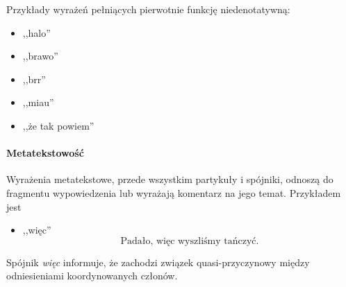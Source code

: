 \documentclass[12pt]{mwart}
\theoremstyle{remark}
\begin{document}
Przykłady wyrażeń pełniących pierwotnie funkcję niedenotatywną:
\begin{itemize}
	\item ,,halo''
	\item ,,brawo''
	\item ,,brr''
	\item ,,miau''
	\item ,,że tak powiem''
\end{itemize}

\paragraph{Metatekstowość}
Wyrażenia metatekstowe, przede wszystkim partykuły i spójniki, odnoszą do fragmentu wypowiedzenia lub wyrażają komentarz na jego temat. Przykładem jest
\begin{itemize}
\item ,,więc''
\begin{equation}
	\text{Padało, więc wyszliśmy tańczyć.} 
\end{equation}
\end{itemize}
Spójnik \emph{więc} informuje, że zachodzi związek quasi-przyczynowy między odniesieniami koordynowanych członów.
\end{document}
